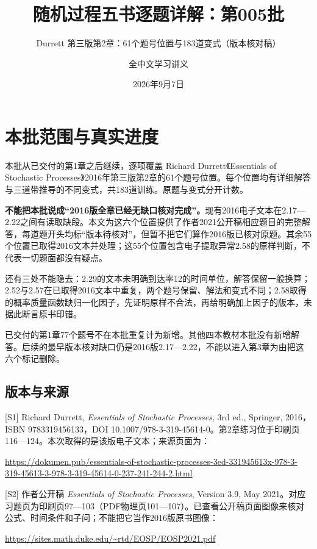 \documentclass[
  11pt,
  a4paper,
  UTF8,fontset=fandol]{ctexart}
\title{随机过程五书逐题详解：第005批}
\subtitle{Durrett 第三版第2章：61个题号位置与183道变式（版本核对稿）}
\author{全中文学习讲义}
\date{2026年9月7日}
\let\OldSection\section
\renewcommand{\section}{\Needspace{7\baselineskip}\OldSection}
\let\OldSubsection\subsection
\renewcommand{\subsection}{\Needspace{5\baselineskip}\OldSubsection}
\begin{document}
\maketitle

{
\setcounter{tocdepth}{1}
\tableofcontents
}
\section{本批范围与真实进度}\label{ux672cux6279ux8303ux56f4ux4e0eux771fux5b9eux8fdbux5ea6}

本批从已交付的第1章之后继续，逐项覆盖 Richard Durrett《Essentials of
Stochastic
Processes》2016年第三版第2章的61个题号位置。每个位置均有详细解答与三道带推导的不同变式，共183道训练。原题与变式分开计数。

\textbf{不能把本批说成``2016版全章已经无缺口核对完成''。}现有2016电子文本在2.17---2.22之间有读取缺段。本文为这六个位置提供了作者2021公开稿相应题目的完整解答，每道题开头均标``版本待核对''，但暂不把它们算作2016版已核对原题。其余55个位置已取得2016文本并处理；这55个位置包含电子提取异常2.58的原样判断，不代表一切题面都没有疑点。

还有三处不能隐去：2.29的文本未明确到达率12的时间单位，解答保留一般换算；2.52与2.57在已取得2016文本中重复，两个题号保留、解法和变式不同；2.58取得的概率质量函数缺归一化因子，先证明原样不合法，再给明确加上因子的版本，未据此断言原书印错。

已交付的第1章77个题号不在本批重复计为新增。其他四本教材本批没有新增解答。后续的最早版本核对缺口仍是2016版2.17---2.22，不能以进入第3章为由把这六个标记删除。

\subsection{版本与来源}\label{ux7248ux672cux4e0eux6765ux6e90}

{[}S1{]} Richard Durrett, \emph{Essentials of Stochastic Processes}, 3rd
ed., Springer, 2016，ISBN 9783319456133，DOI
10.1007/978-3-319-45614-0。第2章练习位于印刷页116---124。本次取得的是该版电子文本；来源页面为：

\url{https://dokumen.pub/essentials-of-stochastic-processes-3ed-331945613x-978-3-319-45613-3-978-3-319-45614-0-237-241-244-2.html}

{[}S2{]} 作者公开稿 \emph{Essentials of Stochastic Processes}, Version
3.9, May
2021。对应习题页为印刷页97---103（PDF物理页101---107）。已查看公开稿页面图像来核对公式、时间条件和子问；不能把它当作2016版原书图像：

\url{https://sites.math.duke.edu/~rtd/EOSP/EOSP2021.pdf}
\end{document}
